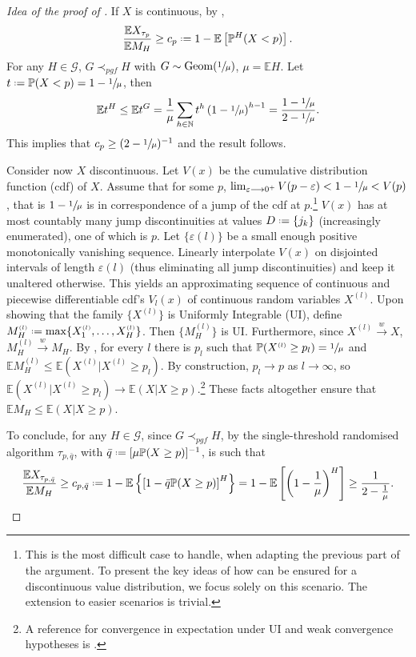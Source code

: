 \documentclass[11pt, a4paper, twoside]{article}
\newcommand*{\defeq}{\mathrel{\vcenter{\baselineskip0.5ex \lineskiplimit0pt
			\hbox{\scriptsize.}\hbox{\scriptsize.}}}=}
\newcommand{\ssup}[1]{{\scriptscriptstyle{({#1})}}}
\newcommand{\eps}{\varepsilon}
\newcommand{\NN}{\mathbb{N}}
\newcommand{\EE}{\mathbb{E}}
\newcommand{\PP}{\mathbb{P}}
\newcommand{\PGF}{\mathcal{G}}
\DeclareMathOperator{\Geom}{Geom}
\numberwithin{equation}{section}
\begin{document}
    \begin{proof}[Idea of the proof of ]
	If $X$ is continuous, by ,
	\[\frac{\EE X_{\tau_p}}{\EE M_H}\ge c_p\defeq1-\EE\left[\PP^H(X<p)\right].\]
	For any $H\in\PGF$, $G\prec_{pgf}H$ with $G\sim\Geom(\sfrac{1}{\mu})$, $\mu=\EE H$. Let $t\defeq \PP(X<p)=1-\sfrac{1}{\mu}$, then \[\EE t^H\le \EE t^G=\frac{1}{\mu}\sum_{h\in\NN}t^h\left(1-\sfrac{1}{\mu}\right)^{h-1}=\frac{1-\sfrac{1}{\mu}}{2-\sfrac{1}{\mu}}.\] This implies that 
	$c_p\ge (2-\sfrac{1}{\mu})^{-1}$ and the result follows. 
	
	Consider now $X$ discontinuous. Let $V(x)$ be the cumulative distribution function (cdf) of $X$. Assume that for some $p$, $\lim_{\eps\longrightarrow0^+}V(p-\eps)<1-\sfrac{1}{\mu}<V(p)$, that is $1-\sfrac{1}{\mu}$ is in correspondence of a jump of the cdf at $p$.\footnote{This is the most difficult case to handle, when adapting the previous part of the argument. To present the key ideas of how  can be ensured for a discontinuous value distribution, we focus solely on this scenario. The extension to easier scenarios is trivial.} $V(x)$ has at most countably many jump discontinuities at values $D\defeq\{j_k\}$ (increasingly enumerated), one of which is $p$. Let $\{\eps(l)\}$ be a small enough positive monotonically vanishing sequence. Linearly interpolate $V(x)$ on disjointed intervals of length $\eps(l)$ (thus eliminating all jump discontinuities) and keep it unaltered otherwise. This yields an approximating sequence of continuous and piecewise differentiable cdf's $V_l(x)$ of continuous random variables $X^\ssup{l}$. Upon showing that the family $\{X^\ssup{l}\}$ is Uniformly Integrable (UI), define $M_H^\ssup{l}\defeq \max\{X_1^\ssup{l},\ldots,X_H^\ssup{l}\}$. Then $\{M_H^\ssup{l}\}$ is UI. Furthermore, since $X^\ssup{l}\overset{w}{\longrightarrow}X$, $M_H^\ssup{l}\overset{w}{\longrightarrow}M_H$. By , for every $l$ there is $p_l$ such that $\PP(X^\ssup{l}\ge p_l)=\sfrac{1}{\mu}$ and $\EE M_H^\ssup{l}\le\EE(X^\ssup{l}|X^\ssup{l}\ge p_l)$. By construction, $p_l\longrightarrow p$ as $l\longrightarrow\infty$, so $\EE(X^\ssup{l}|X^\ssup{l}\ge p_l)\longrightarrow \EE(X|X\ge p)$.\footnote{A reference for convergence in expectation under UI and weak convergence hypotheses is \cite{Bill87}.} 
  	These facts altogether ensure that $\EE M_H\le \EE(X|X\ge p)$. 
  	
  	To conclude, for any $H\in\PGF$, since $G\prec_{pgf}H$, by  the single-threshold randomised algorithm $\tau_{p,\bar{q}}$, with $\bar{q}\defeq[\mu\PP(X\ge p)]^{-1}$, is such that 
	\[\frac{\EE X_{\tau_{p,\bar{q}}}}{\EE M_H}\ge c_{p,\bar{q}}\defeq1-\EE\left\lbrace\left[1-\bar{q}\PP(X\ge p)\right]^H\right\rbrace=1-\EE\left[\left(1-\frac{1}{\mu}\right)^H\right]\ge\frac{1}{2-\frac{1}{\mu}}.\]
	\end{proof}
	
\end{document}
